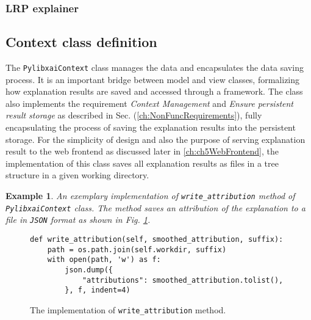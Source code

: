 \documentclass[
    bindingoffset=5mm,  %
    footnoteindent=3mm, %
    hyphenation=true    %
]{src/wut-thesis}
\newtheorem{example}{Example}
\begin{document}
\subsubsection{LRP explainer}

\subsection{Context class definition}

The \texttt{PylibxaiContext} class manages the data and encapsulates the data saving process.
It is an important bridge between model and view classes, formalizing how explanation results
are saved and accessed through a framework.
The class also implements the requirement \textit{Context Management} and \textit{Ensure persistent result storage} as described in Sec. (\ref{ch:NonFuncRequirements}), fully encapsulating the process of
saving the explanation results into the persistent storage. For the simplicity of design and also the purpose of serving
explanation result to the web frontend as discussed later in \ref{ch:ch5WebFrontend},
the implementation of this class saves all explanation results as files in a tree structure in a given working directory.

\begin{example}
    An exemplary implementation of \texttt{write\_attribution} method of \\
    \texttt{PylibxaiContext} class. The method saves an attribution of the explanation to a file in \texttt{JSON} format
    as shown in Fig. \ref{fig:WriteAttributionMethod}.
\end{example}

\begin{figure}%
\begin{verbatim}
def write_attribution(self, smoothed_attribution, suffix):
    path = os.path.join(self.workdir, suffix)
    with open(path, 'w') as f:
        json.dump({
            "attributions": smoothed_attribution.tolist(),
        }, f, indent=4)
\end{verbatim}
\caption{The implementation of \texttt{write\_attribution} method.}
\label{fig:WriteAttributionMethod}
\end{figure}
\end{document}
